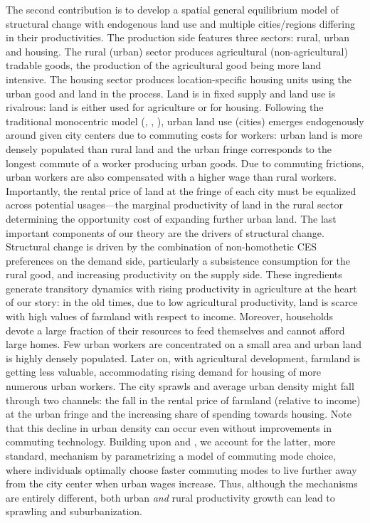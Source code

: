 \documentclass[./20250130-paper.tex]{subfiles}
\begin{document}
	The second contribution is to develop a spatial general equilibrium model of structural change with endogenous land use and multiple cities/regions differing in their productivities. The production side features three sectors: rural, urban and housing. The rural (urban) sector produces agricultural (non-agricultural) tradable goods, the production of the agricultural good being more land intensive. The housing sector produces location-specific housing units using the urban good and land in the process. Land is in fixed supply and land use is rivalrous: land is either used for agriculture or for housing. Following the traditional monocentric model (\cite{alonso1964location}, \cite{muth}, \cite{mills1967aggregative}), urban land use (cities) emerges endogenously around given city centers due to commuting costs for workers: urban land is more densely populated than rural land and the urban fringe corresponds to the longest commute of a worker producing urban goods. Due to commuting frictions, urban workers are also compensated with a higher wage than rural workers. Importantly, the rental price of land at the fringe of each city must be equalized across potential usages---the marginal productivity of land in the rural sector determining the opportunity cost of expanding further urban land. The last important components of our theory are the drivers of structural change. Structural change is driven by the combination of non-homothetic CES preferences on the demand side, particularly a subsistence consumption for the rural good, and increasing productivity on the supply side. These ingredients generate transitory dynamics with rising productivity in agriculture at the heart of our story: in the old times, due to low agricultural productivity, land is scarce with high values of farmland with respect to income. Moreover, households devote a large fraction of their resources to feed themselves and cannot afford large homes. Few urban workers are concentrated on a small area and urban land is highly densely populated. Later on, with agricultural development, farmland is getting less valuable, accommodating rising demand for housing of more numerous urban workers. The city sprawls and average urban density might fall through two channels: the fall in the rental price of farmland (relative to income) at the urban fringe and the increasing share of spending towards housing. Note that this decline in urban density can occur even without improvements in commuting technology. Building upon \cite{leroy1983paradise} and \cite{desalvo1996income}, we account for the latter, more standard, mechanism by parametrizing a model of commuting mode choice, where individuals optimally choose faster commuting modes to live further away from the city center when urban wages increase. Thus, although the mechanisms are entirely different, both urban \textit{and} rural productivity growth can lead to sprawling and suburbanization. %
\end{document}
